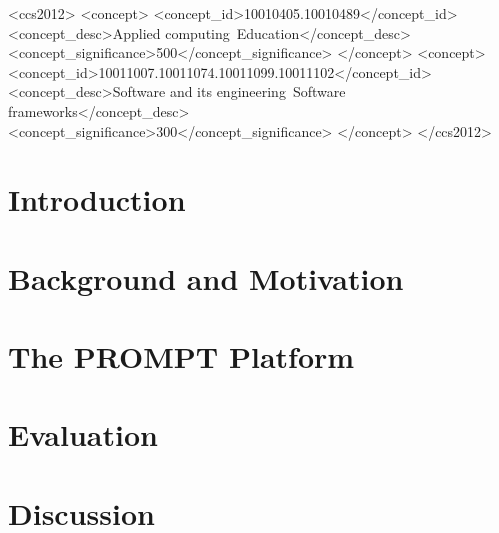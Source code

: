 \documentclass[sigconf,review]{acmart}
\begin{document}
\begin{CCSXML}
<ccs2012>
   <concept>
       <concept_id>10010405.10010489</concept_id>
       <concept_desc>Applied computing~Education</concept_desc>
       <concept_significance>500</concept_significance>
   </concept>
   <concept>
       <concept_id>10011007.10011074.10011099.10011102</concept_id>
       <concept_desc>Software and its engineering~Software frameworks</concept_desc>
       <concept_significance>300</concept_significance>
   </concept>
</ccs2012>
\end{CCSXML}




\maketitle


\section{Introduction}


\section{Background and Motivation}


\section{The PROMPT Platform}


\section{Evaluation}


\section{Discussion}

\end{document}
